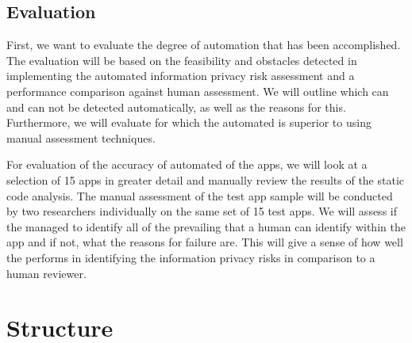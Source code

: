 \documentclass[
	a4paper,
	oneside,
	12pt,
	liststotocnumbered
]{article}
\begin{document}
\subsection{Evaluation}

First, we want to evaluate the degree of \pra automation that has been accomplished. 
The evaluation will be based on the feasibility and obstacles detected in implementing the automated information privacy risk assessment and a performance comparison against human assessment.
We will outline which \iprfs can and can not be detected automatically, as well as the reasons for this.
Furthermore, we will evaluate for which \prfs the automated \sca is superior to using manual assessment techniques.

For evaluation of the accuracy of automated \sca of the apps, we will look at a selection of 15 apps in greater detail and manually review the results of the static code analysis.
The manual assessment of the test app sample will be conducted by two researchers individually on the same set of 15 test apps.
We will assess if the \sca managed to identify all of the prevailing \ipr that a human can identify within the app and if not, what the reasons for failure are.
This will give a sense of how well the \sca performs in identifying the information privacy risks in comparison to a human reviewer.

\section{Structure}
\end{document}
